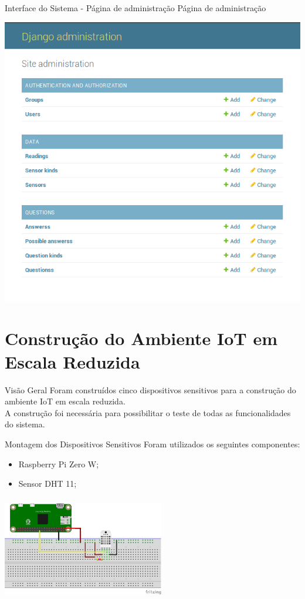\documentclass{beamer}
\begin{document}
  \begin{frame}{Interface do Sistema - Página de administração}
    Página de administração
    \begin{center}
    \includegraphics[scale=0.3]{admin}
    \end{center}
  \end{frame}

  \section{Construção do Ambiente IoT em Escala Reduzida}
    \begin{frame}{Visão Geral}
      \quad Foram construídos cinco dispositivos sensitivos para a construção do ambiente IoT em escala reduzida.
      \\\null \quad A construção foi necessária para possibilitar o teste de todas as funcionalidades do sistema.
    \end{frame}

    \begin{frame}{Montagem dos Dispositivos Sensitivos}
      Foram utilizados os seguintes componentes:
      \begin{itemize}
        \item Raspberry Pi Zero W;
        \item Sensor DHT 11;
      \end{itemize}
      \begin{center}
      \includegraphics[height=130pt, width=200pt]{sensor}
      \end{center}
    \end{frame}
\end{document}
